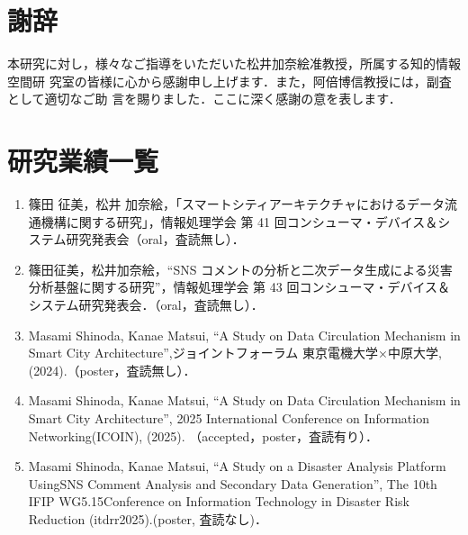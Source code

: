 \clearpage
\chapter*{謝辞}
本研究に対し，様々なご指導をいただいた松井加奈絵准教授，所属する知的情報空間研
究室の皆様に心から感謝申し上げます．また，阿倍博信教授には，副査として適切なご助
言を賜りました．ここに深く感謝の意を表します．


\clearpage
\chapter*{研究業績一覧}
\begin{enumerate}
    \item 篠田 征美，松井 加奈絵，「スマートシティアーキテクチャにおけるデータ流通機構に関する研究」，情報処理学会 第 41 回コンシューマ・デバイス＆システム研究発表会（oral，査読無し）．
    \item 篠田征美，松井加奈絵，“SNS コメントの分析と二次データ生成による災害分析基盤に関する研究”，情報処理学会 第 43 回コンシューマ・デバイス＆システム研究発表会．（oral，査読無し）．
    \item Masami Shinoda, Kanae Matsui, “A Study on Data Circulation Mechanism in Smart City Architecture”,ジョイントフォーラム 東京電機大学×中原大学, (2024).（poster，査読無し）．
    \item Masami Shinoda, Kanae Matsui, “A Study on Data Circulation Mechanism in Smart City Architecture”, 2025 International Conference on Information Networking(ICOIN), (2025). （accepted，poster，査読有り）．
    \item Masami Shinoda, Kanae Matsui, “A Study on a Disaster Analysis Platform UsingSNS Comment Analysis and Secondary Data Generation”, The 10th IFIP WG5.15Conference on Information Technology in Disaster Risk Reduction (itdrr2025).(poster, 査読なし)．
\end{enumerate}
